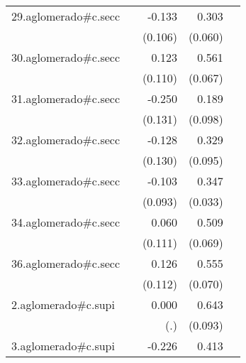 {\begin{longtable}{l*{4}{D{.}{.}{-1}}}
\addlinespace
29.aglomerado#c.secc&                     &      -0.133         &       0.303\sym{***}&                     \\
            &                     &     (0.106)         &     (0.060)         &                     \\
\addlinespace
30.aglomerado#c.secc&                     &       0.123         &       0.561\sym{***}&                     \\
            &                     &     (0.110)         &     (0.067)         &                     \\
\addlinespace
31.aglomerado#c.secc&                     &      -0.250         &       0.189         &                     \\
            &                     &     (0.131)         &     (0.098)         &                     \\
\addlinespace
32.aglomerado#c.secc&                     &      -0.128         &       0.329\sym{***}&                     \\
            &                     &     (0.130)         &     (0.095)         &                     \\
\addlinespace
33.aglomerado#c.secc&                     &      -0.103         &       0.347\sym{***}&                     \\
            &                     &     (0.093)         &     (0.033)         &                     \\
\addlinespace
34.aglomerado#c.secc&                     &       0.060         &       0.509\sym{***}&                     \\
            &                     &     (0.111)         &     (0.069)         &                     \\
\addlinespace
36.aglomerado#c.secc&                     &       0.126         &       0.555\sym{***}&                     \\
            &                     &     (0.112)         &     (0.070)         &                     \\
\addlinespace
2.aglomerado#c.supi&                     &       0.000         &       0.643\sym{***}&                     \\
            &                     &         (.)         &     (0.093)         &                     \\
\addlinespace
3.aglomerado#c.supi&                     &      -0.226         &       0.413\sym{***}&                     \\

\end{longtable}}
